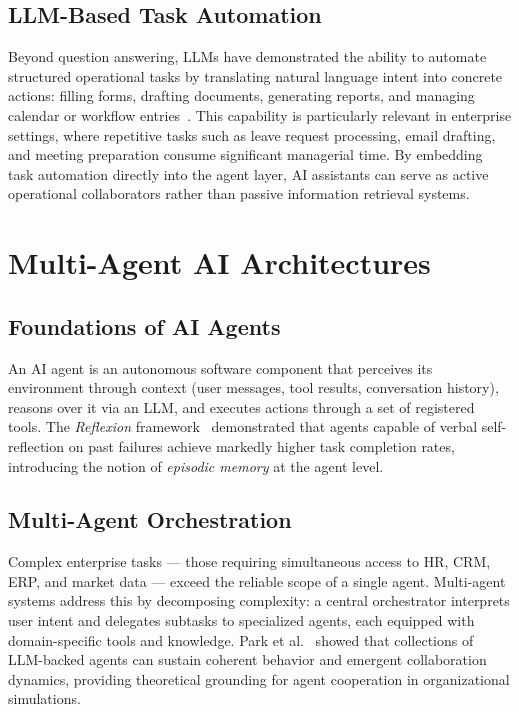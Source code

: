 \subsection{LLM-Based Task Automation}

Beyond question answering, LLMs have demonstrated the ability to automate
structured operational tasks by translating natural language intent into
concrete actions: filling forms, drafting documents, generating reports, and
managing calendar or workflow entries~\cite{shen2023hugginggpt}. This
capability is particularly relevant in enterprise settings, where repetitive
tasks such as leave request processing, email drafting, and meeting
preparation consume significant managerial time. By embedding task automation
directly into the agent layer, AI assistants can serve as active operational
collaborators rather than passive information retrieval systems.

\section{Multi-Agent AI Architectures}

\subsection{Foundations of AI Agents}

An AI agent is an autonomous software component that perceives its
environment through context (user messages, tool results, conversation
history), reasons over it via an LLM, and executes actions through a set of
registered tools. The \textit{Reflexion} framework~\cite{shinn2023reflexion}
demonstrated that agents capable of verbal self-reflection on past failures
achieve markedly higher task completion rates, introducing the notion of
\textit{episodic memory} at the agent level.

\subsection{Multi-Agent Orchestration}

Complex enterprise tasks — those requiring simultaneous access to HR, CRM,
ERP, and market data — exceed the reliable scope of a single agent.
Multi-agent systems address this by decomposing complexity: a central
orchestrator interprets user intent and delegates subtasks to specialized
agents, each equipped with domain-specific tools and knowledge.
Park et al.~\cite{park2023generative} showed that collections of LLM-backed
agents can sustain coherent behavior and emergent collaboration dynamics,
providing theoretical grounding for agent cooperation in organizational
simulations.

